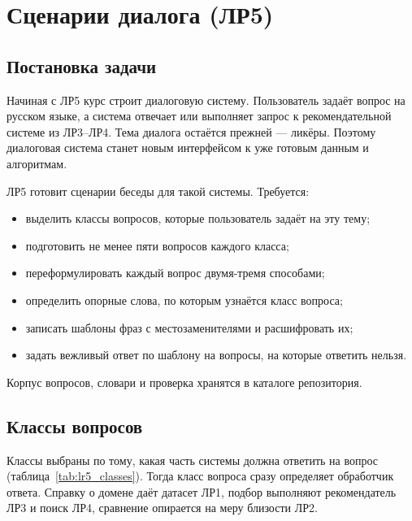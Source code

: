 \chapter{Сценарии диалога (ЛР5)}

\newcommand{\lrslot}[1]{$\langle$#1$\rangle$}

\section{Постановка задачи}

Начиная с ЛР5 курс строит диалоговую систему. Пользователь задаёт вопрос на русском языке, а система отвечает или выполняет запрос к рекомендательной системе из ЛР3--ЛР4. Тема диалога остаётся прежней --- ликёры. Поэтому диалоговая система станет новым интерфейсом к уже готовым данным и алгоритмам.

ЛР5 готовит сценарии беседы для такой системы. Требуется:
\begin{itemize}[leftmargin=1.6\parindent, label*=---]
	\item выделить классы вопросов, которые пользователь задаёт на эту тему;
	\item подготовить не менее пяти вопросов каждого класса;
	\item переформулировать каждый вопрос двумя-тремя способами;
	\item определить опорные слова, по которым узнаётся класс вопроса;
	\item записать шаблоны фраз с местозаменителями и расшифровать их;
	\item задать вежливый ответ по шаблону на вопросы, на которые ответить нельзя.
\end{itemize}

Корпус вопросов, словари и проверка хранятся в каталоге  репозитория.

\section{Классы вопросов}

Классы выбраны по тому, какая часть системы должна ответить на вопрос (таблица~\ref{tab:lr5_classes}). Тогда класс вопроса сразу определяет обработчик ответа. Справку о домене даёт датасет ЛР1, подбор выполняют рекомендатель ЛР3 и поиск ЛР4, сравнение опирается на меру близости ЛР2.

